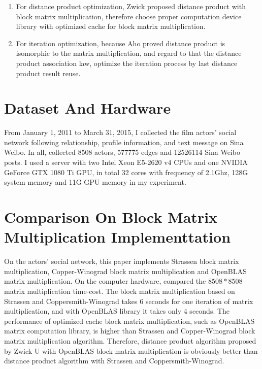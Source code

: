 \documentclass[review]{cvpr}
\begin{document}
\begin{enumerate}
\item For distance product optimization, Zwick proposed distance product with block matrix multiplication, therefore choose proper computation device library with optimized cache for block matrix multiplication.
\item For iteration optimization, because Aho proved distance product is isomorphic to the matrix multiplication, and regard to that the distance product association law, optimize the iteration process by last distance product result reuse.
\end{enumerate}


\section{Dataset And Hardware}
From January 1, 2011 to March 31, 2015, I collected the film actors' social network following relationship, profile information, and text message on Sina Weibo.
In all, collected 8508 actors, 577775 edges and 12526114 Sina Weibo posts.
I used a server with two Intel Xeon E5-2620 v4 CPUs and one NVIDIA GeForce GTX 1080 Ti GPU, in total 32 cores with frequency of 2.1Ghz, 128G system memory and 11G GPU memory in my experiment.



\section{Comparison On Block Matrix Multiplication Implementtation}
On the actors' social network, this paper implements Strassen block matrix multiplication, Copper-Winograd block matrix multiplication and OpenBLAS matrix multiplication. On the computer hardware, compared the $8508*8508$ matrix multiplication time-cost.
The block matrix multiplication based on Strassen and Coppersmith-Winograd takes 6 seconds for one iteration of matrix multiplication, and with OpenBLAS library it takes only 4 seconds.
The performance of optimized cache block matrix multiplication, such as OpenBLAS matrix computation library, is higher than Strassen and Copper-Winograd block matrix multiplication algorithm.
Therefore, distance product algorithm proposed by Zwick U with OpenBLAS block matrix multiplication is obviously better than distance product algorithm with Strassen and Coppersmith-Winograd.
\end{document}
